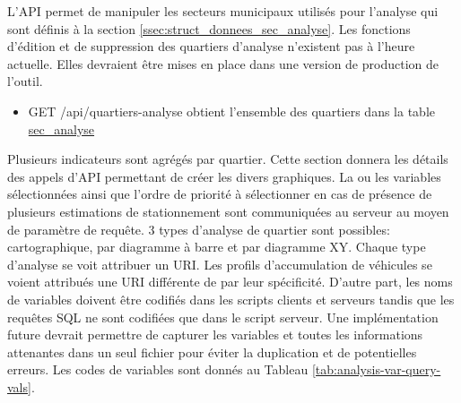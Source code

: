 L'\ac{API} permet de manipuler les secteurs municipaux utilisés pour l'analyse qui sont définis à la section \ref{ssec:struct_donnees_sec_analyse}. Les fonctions d'édition et de suppression des quartiers d'analyse n'existent pas à l'heure actuelle. Elles devraient être mises en place dans une version de production de l'outil.
\begin{itemize}
    \item GET /api/quartiers-analyse obtient l'ensemble des quartiers dans la table \ul{sec\_analyse}
\end{itemize}
Plusieurs indicateurs sont agrégés par quartier. Cette section donnera les détails des appels d'\ac{API} permettant de créer les divers graphiques. La ou les variables sélectionnées ainsi que l'ordre de priorité à sélectionner en cas de présence de plusieurs estimations de stationnement sont communiquées au serveur au moyen de paramètre de requête. 3 types d'analyse de quartier sont possibles: cartographique, par diagramme à barre et par diagramme XY. Chaque type d'analyse se voit attribuer un \ac{URI}. Les profils d'accumulation de véhicules se voient attribués une \ac{URI} différente de par leur spécificité. D'autre part, les noms de variables doivent être codifiés dans les scripts clients et serveurs tandis que les requêtes SQL ne sont codifiées que dans le script serveur. Une implémentation future devrait permettre de capturer les variables et toutes les informations attenantes dans un seul fichier pour éviter la duplication et de potentielles erreurs. Les codes de variables sont donnés au Tableau \ref{tab:analysis-var-query-vals}.

